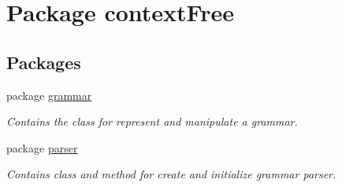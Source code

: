 \hypertarget{namespacecontext_free}{\section{Package context\-Free}
\label{namespacecontext_free}
}
\subsection*{Packages}
\begin{DoxyCompactItemize}
\item 
package \hyperlink{namespacecontext_free_1_1grammar}{grammar}
\begin{DoxyCompactList}\small\item\em Contains the class for represent and manipulate a grammar. \end{DoxyCompactList}\item 
package \hyperlink{namespacecontext_free_1_1parser}{parser}
\begin{DoxyCompactList}\small\item\em Contains class and method for create and initialize grammar parser. \end{DoxyCompactList}\end{DoxyCompactItemize}
